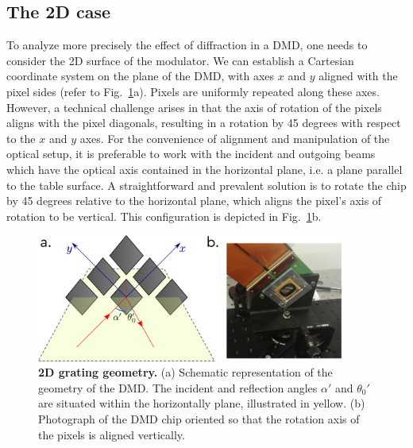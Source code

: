 \documentclass[12pt]{iopart}
\begin{document}


\subsection{The 2D case}

To analyze more precisely the effect of diffraction in a DMD,
one needs to consider the 2D surface of the modulator.
We can establish a Cartesian coordinate system on the plane of the DMD,
with axes $x$ and $y$ aligned with the pixel sides
(refer to Fig.~\ref{fig:2d_geom}a).
Pixels are uniformly repeated along these axes.
However, a technical challenge arises
in that the axis of rotation of the pixels
aligns with the pixel diagonals,
resulting in a rotation by 45 degrees with respect to the $x$ and $y$ axes.
For the convenience of alignment and manipulation of the optical setup,
it is preferable to work with the incident and outgoing beams
which have the optical axis contained in the horizontal plane,
i.e. a plane parallel to the table surface.
A straightforward and prevalent solution is to rotate the chip by 45 degrees
relative to the horizontal plane,
which aligns the pixel’s axis of rotation to be vertical.
This configuration is depicted in Fig.~\ref{fig:2d_geom}b.\\



\begin{figure}
  \centering
  \includegraphics[width = 0.9\textwidth]{images/dmd_45.pdf}
  \caption{
    \textbf{2D grating geometry.}
    (a) Schematic representation of the geometry of the DMD.
    The incident  and reflection angles $\alpha'$ and $\theta_0'$ are situated
    within the horizontally plane, illustrated in yellow.
    (b) Photograph of the DMD chip oriented so that the rotation axis of the pixels
    is aligned vertically.
  }
  \label{fig:2d_geom}
\end{figure}
\end{document}
